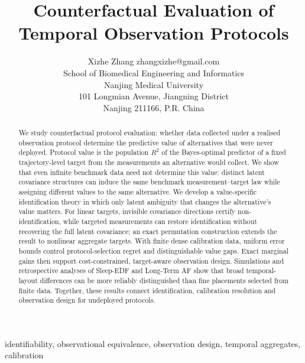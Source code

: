 \documentclass[twoside,11pt]{article}
\title{Counterfactual Evaluation of Temporal Observation Protocols}
\author{\name Xizhe Zhang \email zhangxizhe@gmail.com \\
        \addr School of Biomedical Engineering and Informatics\\
        Nanjing Medical University\\
        101 Longmian Avenue, Jiangning District\\
        Nanjing 211166, P.R. China}
\theoremstyle{plain}
\theoremstyle{definition}
\theoremstyle{remark}
\begin{document}
\maketitle
\thispagestyle{plain}

\begin{abstract}%
We study counterfactual protocol evaluation: whether data collected under a realised observation protocol determine the predictive value of alternatives that were never deployed. Protocol value is the population $R^2$ of the Bayes-optimal predictor of a fixed trajectory-level target from the measurements an alternative would collect. We show that even infinite benchmark data need not determine this value: distinct latent covariance structures can induce the same benchmark measurement--target law while assigning different values to the same alternative. We develop a value-specific identification theory in which only latent ambiguity that changes the alternative's value matters. For linear targets, invisible covariance directions certify non-identification, while targeted measurements can restore identification without recovering the full latent covariance; an exact permutation construction extends the result to nonlinear aggregate targets. With finite dense calibration data, uniform error bounds control protocol-selection regret and distinguishable value gaps. Exact marginal gains then support cost-constrained, target-aware observation design. Simulations and retrospective analyses of Sleep-EDF and Long-Term AF show that broad temporal-layout differences can be more reliably distinguished than fine placements selected from finite data. Together, these results connect identification, calibration resolution and observation design for undeployed protocols.
\end{abstract}

\begin{keywords}
identifiability, observational equivalence, observation design,
temporal aggregates, calibration
\end{keywords}










\appendix






\begingroup
\small
\setlength{\baselineskip}{10.8pt}

\endgroup
\end{document}
